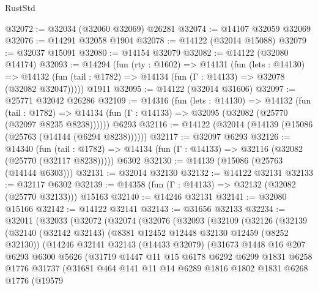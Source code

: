\begin{lexlean}{RustStd}
\begin{coremodule}
@32072 := @32034 (@32060 @32069) @26281
@32074 := @14107 @32059 @32069
@32076 := @14291 @32058 @1904
@32078 := @14122 (@32014 @15088)
@32079 := @32037 @15091
@32080 := @14154 @32079
@32082 := @14122 (@32080 @14174)
@32093 := @14294
    (fun (rty : @1602) =>
    @14131
      (fun (lets : @14130) =>
      @14132 (fun (tail : @1782) => @14134 (fun (Γ : @14133) => @32078 (@32082 @32047)))))
    @1911
@32095 := @14122 (@32014 @31606)
@32097 := @25771 @32042 @26286
@32109 := @14316
    (fun (lets : @14130) =>
    @14132
      (fun (tail : @1782) =>
      @14134 (fun (Γ : @14133) => @32095 (@32082 (@25770 (@32097 @8235 @8238))))))
    @6293
@32116 := @14122 (@32014 (@14139 (@15086 (@25763 (@14144 (@6294 @8238))))))
@32117 := @32097 @6293
@32126 := @14340
    (fun (tail : @1782) => @14134 (fun (Γ : @14133) => @32116 (@32082 (@25770 (@32117 @8238)))))
    @6302
@32130 := @14139 (@15086 (@25763 (@14144 @6303)))
@32131 := @32014 @32130
@32132 := @14122 @32131
@32133 := @32117 @6302
@32139 := @14358 (fun (Γ : @14133) => @32132 (@32082 (@25770 @32133))) @15163
@32140 := @14246 @32131
@32141 := @32080 @15166
@32142 := @14122 @32141
@32143 := @31656 @32133
@32234 := @32011
    (@32033
      (@32072
        (@32074
          (@32076
            (@32093
              (@32109
                (@32126
                  (@32139
                    (@32140
                      (@32142 @32143)
                      (@8381 @12452 @12448 @32130 @12459 (@8252 @32130))
                      (@14246
                        @32141
                        @32143
                        (@14433 @32079)
                        (@31673
                          @1448
                          @16
                          @207
                          @6293
                          @6300
                          @5626
                          (@31719
                            @1447
                            @11
                            @15
                            @6178
                            @6292
                            @6299
                            @1831
                            @6258
                            @1776
                            @31737
                            (@31681
                              @464
                              @141
                              @11
                              @14
                              @6289
                              @1816
                              @1802
                              @1831
                              @6268
                              @1776
                              (@19579

\end{coremodule}
\end{lexlean}
